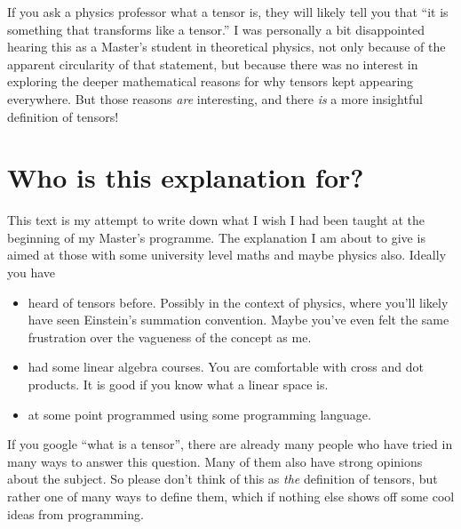 
%  
%  

 
\maketitle

If you ask a physics professor what a tensor is, they will likely tell you that \enquote{it is something that transforms like a tensor.}
I was personally a bit disappointed hearing this as a Master's student in theoretical physics, not only because of the apparent circularity of that statement, but because there was no interest in exploring the deeper mathematical reasons for why tensors kept appearing everywhere.
But those reasons \emph{are} interesting, and there \emph{is} a more insightful definition of tensors!

\section{Who is this explanation for?}%
\label{sec:who_is_this_explanation_for_}

This text is my attempt to write down what I wish I had been taught at the beginning of my Master's programme.
The explanation I am about to give is aimed at those with some university level maths and maybe physics also.
Ideally you have
\begin{itemize}
	\item heard of tensors before.
	Possibly in the context of physics, where you'll likely have seen Einstein's summation convention.
	Maybe you've even felt the same frustration over the vagueness of the concept as me.
	\item had some linear algebra courses.
	You are comfortable with cross and dot products.
	It is good if you know what a linear space is.
	\item at some point programmed using some programming language.
\end{itemize}

If you google \enquote{what is a tensor}, there are already many people who have tried in many ways to answer this question.
Many of them also have strong opinions about the subject.
So please don't think of this as \emph{the} definition of tensors, but rather one of many ways to define them, which if nothing else shows off some cool ideas from programming.

